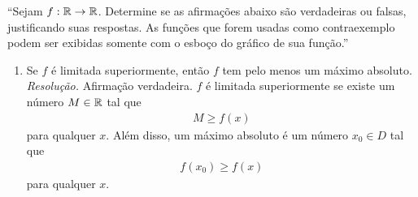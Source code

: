 \enquote{Sejam $f: \mathbb R \rightarrow \mathbb R$. Determine se as afirmações abaixo são
verdadeiras ou falsas, justificando suas respostas. As funções
que forem usadas como contraexemplo podem ser exibidas somente com o esboço do gráfico de sua função.}
\begin{enumerate}
    \item Se $f$ é limitada superiormente, então $f$ tem pelo menos um máximo absoluto. \\
    \emph{Resolução.} Afirmação verdadeira. $f$ é limitada superiormente se existe um número $M \in \mathbb R$ tal que
    \begin{align*}
        M \ge f(x)
    \end{align*}
    para qualquer $x$.
    Além disso, um máximo absoluto é um número $x_0 \in D$ tal que
    \begin{align*}
        f(x_0) \ge f(x)
    \end{align*} 
    para qualquer $x$.
\end{enumerate}